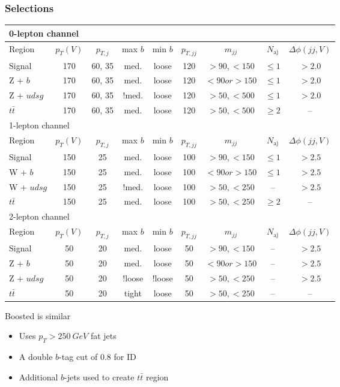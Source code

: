 \documentclass{beamer}
\begin{document}
\begin{frame}
  \frametitle{Selections}

  {\tiny
  \begin{tabular}{|l|c|c|c|c|c|c|c|c|}
    \hline
    \multicolumn{9}{|l|}{0-lepton channel} \\
    \hline
    Region & $p_T(V)$ & $p_{T,j}$ & max $b$ & min $b$ & $p_{T,jj}$ & $m_{jj}$ & $N_\textrm{aj}$ & $\Delta\phi(jj, V)$ \\
    \hline
    Signal & 170 & 60, 35 & med. & loose & 120 & $>90, <150$ & $\le 1$ & $> 2.0$ \\
    Z + $b$ & 170 & 60, 35 & med. & loose & 120 & $<90 or >150$ & $\le 1$ & $> 2.0$ \\
    Z + $udsg$ & 170 & 60, 35 & !med. & loose & 120 & $>50, <500$ & $\le 1$ & $> 2.0$ \\
    $t\bar{t}$ & 170 & 60, 35 & med. & loose & 120 & $>50, <500$ & $\ge 2$ & -- \\
    \hline
    \hline
    \multicolumn{9}{|l|}{1-lepton channel} \\
    \hline
    Region & $p_T(V)$ & $p_{T,j}$ & max $b$ & min $b$ & $p_{T,jj}$ & $m_{jj}$ & $N_\textrm{aj}$ & $\Delta\phi(jj, V)$ \\
    \hline
    Signal & 150 & 25 & med. & loose & 100 & $>90, <150$ & $\le 1$ & $> 2.5$ \\
    W + $b$ & 150 & 25 & med. & loose & 100 & $<90 or >150$ & $\le 1$ & $> 2.5$ \\
    W + $udsg$ & 150 & 25 & !med. & loose & 100 & $>50, <250$ & -- & $> 2.5$ \\
    $t\bar{t}$ & 150 & 25 & med. & loose & 100 & $>50, <250$ & $\ge 2$ & -- \\
    \hline
    \hline
    \multicolumn{9}{|l|}{2-lepton channel} \\
    \hline
    Region & $p_T(V)$ & $p_{T,j}$ & max $b$ & min $b$ & $p_{T,jj}$ & $m_{jj}$ & $N_\textrm{aj}$ & $\Delta\phi(jj, V)$ \\
    \hline
    Signal & 50 & 20 & med. & loose & 50 & $>90, <150$ & -- & $> 2.5$ \\
    Z + $b$ & 50 & 20 & med. & loose & 50 & $<90 or >150$ & -- & $> 2.5$ \\
    Z + $udsg$ & 50 & 20 & !loose & !loose & 50 & $>50, <250$ & -- & $> 2.5$ \\
    $t\bar{t}$ & 50 & 20 & tight & loose & 50 & $>50, <250$ & -- & -- \\
    \hline
  \end{tabular}
  }

  Boosted is similar
  \begin{itemize}
  \item Uses $p_T > \SI{250}{GeV}$ fat jets
  \item A double $b$-tag cut of 0.8 for ID
  \item Additional $b$-jets used to create $t\bar{t}$ region
  \end{itemize}

\end{frame}
\end{document}

